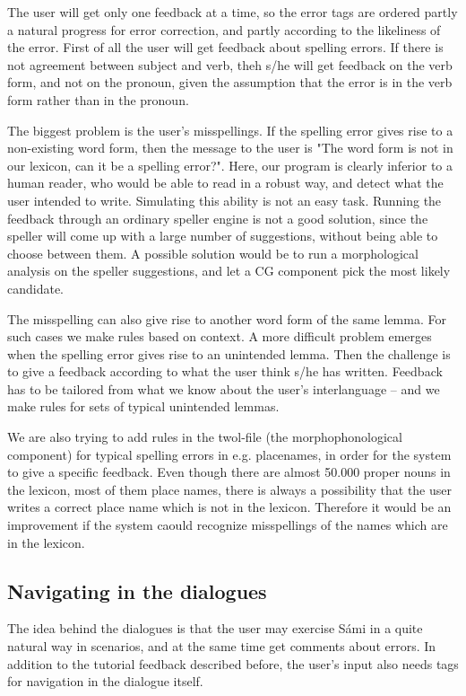 \documentclass[11pt]{article}
\begin{document}
The user will get only one feedback at a time, so the error tags are ordered partly a natural progress for error correction, and partly according to the likeliness of the error. First of all the user will get feedback about spelling errors. If there is not agreement between subject and verb, theh s/he will get feedback on the verb form, and not on the pronoun, given the assumption that the error is in the verb form rather than in the pronoun.

The biggest problem is the user's misspellings. If the spelling error gives rise to a non-existing word form, then the message to the user is "The word form is not in our lexicon, can it be a spelling error?". Here, our program is clearly inferior to a human reader, who would be able to read in a robust way, and detect what the user intended to write.  Simulating this ability is not an easy task. Running the feedback through an ordinary speller engine is not a good solution, since the speller will come up with a large number of suggestions, without being able to choose between them.
A possible solution would be to run a morphological analysis on the speller suggestions, and let a CG component pick the most likely candidate.

The misspelling can also give rise to another word form of the same lemma. For such cases we make rules based on context. A more difficult problem emerges when the spelling error gives rise to an unintended lemma. Then the challenge is to give a feedback according to what the user think s/he has written. Feedback has to be tailored from what we know about the user’s interlanguage – and we make rules for sets of typical unintended lemmas.

We are also trying to add rules in the twol-file (the morphophonological component) for typical spelling errors in e.g. placenames, in order for the system to give a specific feedback. Even though there are almost 50.000 proper nouns in the lexicon, most of them place names, there is always a possibility that the user writes a correct place name which is not in the lexicon. Therefore it would be an improvement if the system caould recognize misspellings of the names which are in the lexicon.

\subsection{Navigating in the dialogues}
The idea behind the dialogues is that the user may exercise Sámi in a quite natural way in scenarios, and at the same time get comments about errors. In addition to the tutorial feedback described before, the user's input also needs tags for navigation in the dialogue itself.
\end{document}
